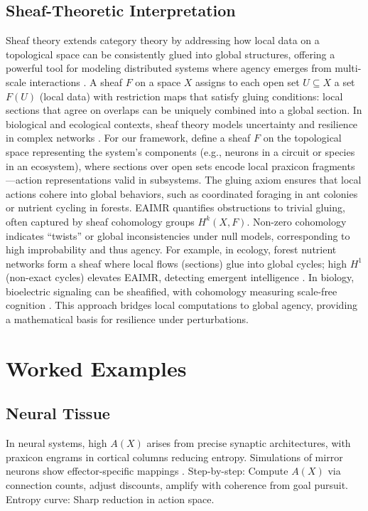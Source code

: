 \documentclass{article}
\begin{document}
\subsection{Sheaf-Theoretic Interpretation}
Sheaf theory extends category theory by addressing how local data on a topological space can be consistently glued into global structures, offering a powerful tool for modeling distributed systems where agency emerges from multi-scale interactions \citep{spivak2024}. A sheaf $F$ on a space $X$ assigns to each open set $U \subseteq X$ a set $F(U)$ (local data) with restriction maps that satisfy gluing conditions: local sections that agree on overlaps can be uniquely combined into a global section. In biological and ecological contexts, sheaf theory models uncertainty and resilience in complex networks \citep{stenzel2024}. For our framework, define a sheaf $F$ on the topological space representing the system’s components (e.g., neurons in a circuit or species in an ecosystem), where sections over open sets encode local praxicon fragments---action representations valid in subsystems. The gluing axiom ensures that local actions cohere into global behaviors, such as coordinated foraging in ant colonies or nutrient cycling in forests. EAIMR quantifies obstructions to trivial gluing, often captured by sheaf cohomology groups $H^k(X, F)$. Non-zero cohomology indicates ``twists'' or global inconsistencies under null models, corresponding to high improbability and thus agency. For example, in ecology, forest nutrient networks form a sheaf where local flows (sections) glue into global cycles; high $H^1$ (non-exact cycles) elevates EAIMR, detecting emergent intelligence \citep{levin2019}. In biology, bioelectric signaling can be sheafified, with cohomology measuring scale-free cognition \citep{levin2019,spivak2024}. This approach bridges local computations to global agency, providing a mathematical basis for resilience under perturbations.

\section{Worked Examples}
\label{sec:examples}

\subsection{Neural Tissue}
In neural systems, high $A(X)$ arises from precise synaptic architectures, with praxicon engrams in cortical columns reducing entropy. Simulations of mirror neurons show effector-specific mappings \citep{gallese1998mirror}. Step-by-step: Compute $A(X)$ via connection counts, adjust discounts, amplify with coherence from goal pursuit. Entropy curve: Sharp reduction in action space.
\end{document}
